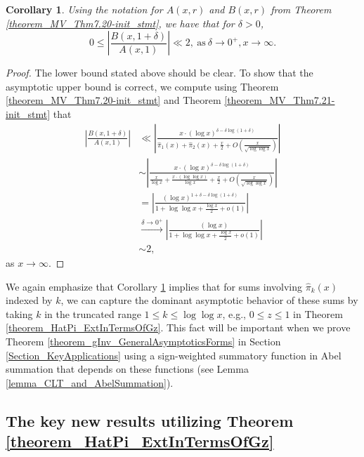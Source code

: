 \documentclass[11pt,reqno,a4letter]{article}
\numberwithin{figure}{section}
\numberwithin{table}{section}
\theoremstyle{plain}
\newtheorem{cor}[theorem]{Corollary}
\numberwithin{theorem}{section}
\theoremstyle{definition}
\begin{document}
\begin{cor} 
\label{theorem_MV_Thm7.20} 
Using the notation for $A(x, r)$ and $B(x, r)$ from 
Theorem \ref{theorem_MV_Thm7.20-init_stmt}, 
we have that for $\delta > 0$, 
\[
0 \leq \left\lvert \frac{B(x, 1+\delta)}{A(x, 1)} \right\rvert \ll 2, 
     \mathrm{\ as\ } \delta \rightarrow 0^{+}, x \rightarrow \infty. 
\]
\end{cor} 
\begin{proof} 
The lower bound stated above should be clear. To show that the asymptotic 
upper bound is correct, we compute using Theorem \ref{theorem_MV_Thm7.20-init_stmt} and 
Theorem \ref{theorem_MV_Thm7.21-init_stmt} that 
\begin{align*} 
\left\lvert \frac{B(x, 1+\delta)}{A(x, 1)} \right\rvert & \ll 
     \left\lvert \frac{x \cdot (\log x)^{\delta - \delta\log(1+\delta)}}{ 
     \widehat{\pi}_1(x) + \widehat{\pi}_2(x) + \frac{x}{2} + 
     O\left(\frac{x}{\sqrt{\log\log x}}\right)} \right\rvert \\ 
     & \sim 
     \left\lvert \frac{x \cdot (\log x)^{\delta - \delta\log(1+\delta)}}{ 
     \frac{x}{\log x} + \frac{x \cdot (\log\log x)}{\log x} + \frac{x}{2} + 
     O\left(\frac{x}{\sqrt{\log\log x}}\right)} \right\rvert \\ 
     & = 
     \left\lvert \frac{(\log x)^{1 + \delta - \delta\log(1+\delta)}}{ 
     1 + \log\log x + \frac{\log x}{2} + o(1)}\right\rvert \\ 
     & \xrightarrow{\delta \rightarrow 0^{+}} 
     \left\lvert \frac{(\log x)}{ 
     1 + \log\log x + \frac{\log x}{2} + o(1)} \right\rvert \\ 
     & \sim 2, 
\end{align*} 
as $x \rightarrow \infty$. 
\end{proof} 

We again emphasize that 
Corollary \ref{theorem_MV_Thm7.20} implies that for sums involving $\widehat{\pi}_k(x)$ indexed by $k$, 
we can capture the dominant asymptotic behavior of these sums by taking $k$ in the truncated range 
$1 \leq k \leq \log\log x$, e.g., $0 \leq z \leq 1$ in Theorem \ref{theorem_HatPi_ExtInTermsOfGz}. 
This fact will be important when we prove 
Theorem \ref{theorem_gInv_GeneralAsymptoticsForms} in 
Section \ref{Section_KeyApplications} using a sign-weighted 
summatory function in Abel summation that depends on these functions 
(see Lemma \ref{lemma_CLT_and_AbelSummation}). 


\subsection{The key new results utilizing Theorem \ref{theorem_HatPi_ExtInTermsOfGz}} 
\label{subSection_PartialPrimeProducts_Proofs} 
\end{document}
